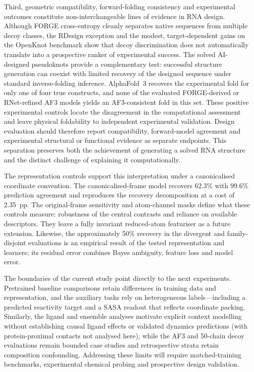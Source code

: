 Third, geometric compatibility, forward-folding consistency and experimental outcomes constitute non-interchangeable lines of evidence in RNA design. Although FORGE cross-entropy cleanly separates native sequences from multiple decoy classes, the RDesign exception and the modest, target-dependent gains on the OpenKnot benchmark show that decoy discrimination does not automatically translate into a prospective ranker of experimental success. The solved AI-designed
pseudoknots provide a complementary test: successful structure generation can coexist with
limited recovery of the designed sequence under standard inverse-folding
inference. AlphaFold~3 recovers the experimental fold for only one of four
true constructs, and none of the evaluated FORGE-derived or RNet-refined AF3
models yields an AF3-consistent fold in this set. These positive experimental controls locate
the disagreement in the computational assessment and leave physical
foldability to independent experimental validation. Design evaluation should
therefore report compatibility, forward-model agreement and experimental
structural or functional evidence as separate endpoints. This separation
preserves both the achievement of generating a solved RNA structure and the
distinct challenge of explaining it computationally.

The representation controls support this interpretation under a canonicalised
coordinate convention. The canonicalised-frame model recovers 62.3\% with
99.6\% prediction agreement and reproduces the recovery decomposition at
a cost of 2.35~pp. The original-frame sensitivity and atom-channel masks
define what these controls measure: robustness of the central contrasts and
reliance on available descriptors. They leave a fully invariant reduced-atom
featuriser as a future extension. Likewise, the approximately 50\% recovery in
the divergent and family-disjoint evaluations is an empirical result of the
tested representation and learners; its residual error combines Bayes
ambiguity, feature loss and model error.

The boundaries of the current study point directly to the next experiments. Pretrained baseline comparisons retain differences in training data and representation, and the auxiliary tasks rely on heterogeneous labels—including a predicted reactivity target and a SASA readout that reflects coordinate packing. Similarly, the ligand and ensemble analyses motivate explicit context modelling without establishing causal ligand effects or validated dynamics predictions (with protein-proximal contacts not analysed here), while the AF3 and 50-chain decoy evaluations remain bounded case studies and retrospective strata retain composition confounding. Addressing these limits will require matched-training benchmarks, experimental chemical probing and prospective design validation.

